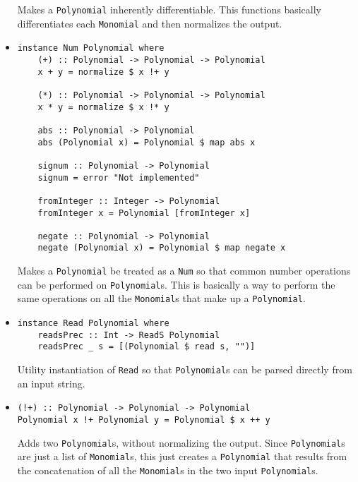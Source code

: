 \documentclass[11pt,a4paper]{article}
\begin{document}
\begin{itemize}
          Makes a \lstinline{Polynomial} inherently differentiable. This functions basically differentiates each \lstinline{Monomial} and then normalizes the output.

    \item \begin{lstlisting}
instance Num Polynomial where
    (+) :: Polynomial -> Polynomial -> Polynomial
    x + y = normalize $ x !+ y

    (*) :: Polynomial -> Polynomial -> Polynomial
    x * y = normalize $ x !* y
    
    abs :: Polynomial -> Polynomial
    abs (Polynomial x) = Polynomial $ map abs x
    
    signum :: Polynomial -> Polynomial
    signum = error "Not implemented"
    
    fromInteger :: Integer -> Polynomial
    fromInteger x = Polynomial [fromInteger x]
    
    negate :: Polynomial -> Polynomial
    negate (Polynomial x) = Polynomial $ map negate x
    \end{lstlisting}

          Makes a \lstinline{Polynomial} be treated as a \lstinline{Num} so that common number operations can be performed on \lstinline{Polynomial}s. This is basically a way to perform the same operations on all the \lstinline{Monomial}s that make up a \lstinline{Polynomial}.

    \item \begin{lstlisting}
instance Read Polynomial where
    readsPrec :: Int -> ReadS Polynomial
    readsPrec _ s = [(Polynomial $ read s, "")]
    \end{lstlisting}

          Utility instantiation of \lstinline{Read} so that \lstinline{Polynomial}s can be parsed directly from an input string.

    \item \begin{lstlisting}
(!+) :: Polynomial -> Polynomial -> Polynomial
Polynomial x !+ Polynomial y = Polynomial $ x ++ y
    \end{lstlisting}

          Adds two \lstinline{Polynomial}s, without normalizing the output. Since \lstinline{Polynomial}s are just a list of \lstinline{Monomial}s, this just creates a \lstinline{Polynomial} that results from the concatenation of all the \lstinline{Monomial}s in the two input \lstinline{Polynomial}s.


\end{itemize}
\end{document}
